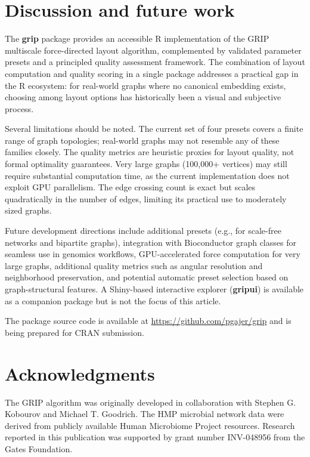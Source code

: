 \section{Discussion and future work}\label{discussion-and-future-work}

The \textbf{grip} package provides an accessible R implementation of the GRIP
multiscale force-directed layout algorithm, complemented by validated
parameter presets and a principled quality assessment framework. The
combination of layout computation and quality scoring in a single package
addresses a practical gap in the R ecosystem: for real-world graphs where no
canonical embedding exists, choosing among layout options has historically
been a visual and subjective process.

Several limitations should be noted. The current set of four presets covers
a finite range of graph topologies; real-world graphs may not resemble any of
these families closely. The quality metrics are heuristic proxies for layout
quality, not formal optimality guarantees. Very large graphs (100,000+
vertices) may still require substantial computation time, as the current
implementation does not exploit GPU parallelism. The edge crossing count is
exact but scales quadratically in the number of edges, limiting its practical
use to moderately sized graphs.

Future development directions include additional presets (e.g., for
scale-free networks and bipartite graphs), integration with Bioconductor
graph classes for seamless use in genomics workflows, GPU-accelerated force
computation for very large graphs, additional quality metrics such as angular
resolution and neighborhood preservation, and potential automatic preset
selection based on graph-structural features. A Shiny-based interactive
explorer (\textbf{gripui}) is available as a companion package but is not the
focus of this article.

The package source code is available at
\url{https://github.com/pgajer/grip} and is being prepared for CRAN
submission.

\section{Acknowledgments}\label{acknowledgments}

The GRIP algorithm was originally developed in collaboration with Stephen G.
Kobourov and Michael T. Goodrich. The HMP microbial network data were derived
from publicly available Human Microbiome Project resources. Research reported
in this publication was supported by grant number INV-048956 from the Gates
Foundation.

